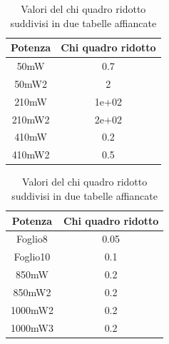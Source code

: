 \begin{table}[h!]
\centering
\begin{minipage}{0.45\textwidth}
\centering
\begin{tabular}{|c|c|}
\hline
Potenza & Chi quadro ridotto \\
\hline
50mW & 0.7 \\
50mW2 & 2 \\
210mW & 1e+02 \\
210mW2 & 2e+02 \\
410mW & 0.2 \\
410mW2 & 0.5 \\
\hline
\end{tabular}
\end{minipage}
\hspace{0.05\textwidth}
\begin{minipage}{0.45\textwidth}
\centering
\begin{tabular}{|c|c|}
\hline
Potenza & Chi quadro ridotto \\
\hline
Foglio8 & 0.05 \\
Foglio10 & 0.1 \\
850mW & 0.2 \\
850mW2 & 0.2 \\
1000mW2 & 0.2 \\
1000mW3 & 0.2 \\
\hline
\end{tabular}
\end{minipage}
\caption{Valori del chi quadro ridotto suddivisi in due tabelle affiancate}
\end{table}
